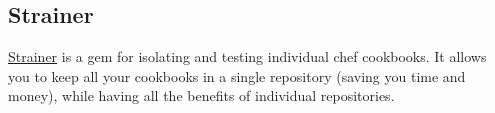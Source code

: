 \subsection{Strainer}

\href{https://github.com/customink/strainer}{Strainer} is a gem for isolating and testing individual chef cookbooks. It allows you to keep all your cookbooks in a single repository (saving you time and money), while having all the benefits of individual repositories.